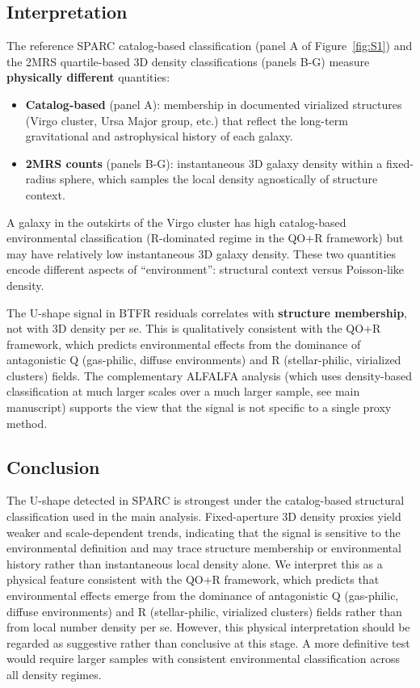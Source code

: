 \subsection*{Interpretation}

The reference SPARC catalog-based classification (panel A of
Figure~\ref{fig:S1}) and the 2MRS quartile-based 3D density
classifications (panels B-G) measure \textbf{physically different}
quantities:

\begin{itemize}
    \item \textbf{Catalog-based} (panel A): membership in documented
    virialized structures (Virgo cluster, Ursa Major group, etc.) that
    reflect the long-term gravitational and astrophysical history of
    each galaxy.
    \item \textbf{2MRS counts} (panels B-G): instantaneous 3D galaxy
    density within a fixed-radius sphere, which samples the local
    density agnostically of structure context.
\end{itemize}

A galaxy in the outskirts of the Virgo cluster has high catalog-based
environmental classification (R-dominated regime in the QO+R framework)
but may have relatively low instantaneous 3D galaxy density. These two
quantities encode different aspects of ``environment'': structural
context versus Poisson-like density.

The U-shape signal in BTFR residuals correlates with \textbf{structure
membership}, not with 3D density per se. This is qualitatively consistent with the QO+R framework, which predicts environmental effects from the
dominance of antagonistic Q (gas-philic, diffuse environments) and R
(stellar-philic, virialized clusters) fields. The complementary ALFALFA analysis (which uses density-based
classification at much larger scales over a much larger sample, see main
manuscript) supports the view that the signal is not specific to a single proxy
method.

\subsection*{Conclusion}

The U-shape detected in SPARC is strongest under the catalog-based
structural classification used in the main analysis. Fixed-aperture
3D density proxies yield weaker and scale-dependent trends, indicating
that the signal is sensitive to the environmental definition and may
trace structure membership or environmental history rather than
instantaneous local density alone. We interpret this as a physical
feature consistent with the QO+R framework, which predicts that
environmental effects emerge from the dominance of antagonistic
Q (gas-philic, diffuse environments) and R (stellar-philic, virialized
clusters) fields rather than from local number density per se.
However, this physical interpretation should be regarded as suggestive
rather than conclusive at this stage. A more definitive test would
require larger samples with consistent environmental classification
across all density regimes.
